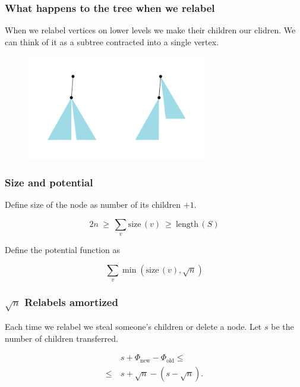 \documentclass[aspectratio=1610,12pt,notheorems]{beamer}
\begin{document}
\begin{frame} \frametitle{What happens to the tree when we relabel} \vspace{1cm}

	When we relabel vertices on lower levels we make their children our clidren. We can think of it as a subtree contracted into a single vertex.

\begin{figure} \centering
	\includegraphics[width=0.7\textwidth]{algolunch/furtpush}
\end{figure}
\end{frame}

\begin{frame} \frametitle{Size and potential}
	Define size of the node as number of its children $+1$.

\begin{block}{\vspace*{-3ex}} \vspace{-1.8ex}
	$$2n\ \ge\ \sum\limits_v \mathrm{size}\, (v)\ \ge\ \mathrm{length}\, (S)$$ \vspace{-1ex}
\end{block}

Define the potential function as
\begin{block}{\vspace*{-3ex}} \vspace{-1.8ex}
	$$\sum\limits_v \min \left( \mathrm{size}\, (v), \sqrt{n} \right)$$ \vspace{-1ex}
\end{block}

\end{frame}

\begin{frame} \frametitle{$\sqrt{n}$ Relabels amortized}
Each time we relabel we steal someone's children or delete a node. Let $s$ be the number of children transferred.

\begin{align*}
	& s + \Phi_{\text{new}} - \Phi_{\text{old}} \le \\
\le\ 	& s + \sqrt{n} - (s - \sqrt{n}).
\end{align*}

\end{frame}
\end{document}
